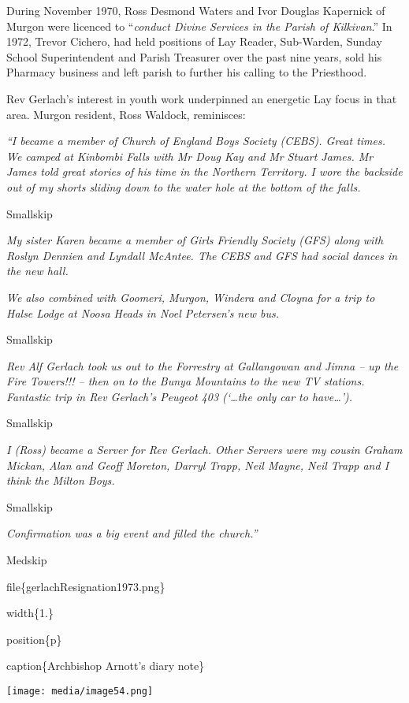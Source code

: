 During November 1970, Ross Desmond Waters and Ivor Douglas Kapernick of Murgon were licenced to ``\emph{conduct Divine Services in the Parish of Kilkivan}.'' In 1972, Trevor Cichero, had held positions of Lay Reader, Sub-Warden, Sunday School Superintendent and Parish Treasurer over the past nine years, sold his Pharmacy business and left parish to further his calling to the Priesthood.

Rev Gerlach's interest in youth work underpinned an energetic Lay focus in that area. Murgon resident, Ross Waldock, reminisces:

\emph{``I became a member of Church of England Boys Society (CEBS). Great times. We camped at Kinbombi Falls with Mr Doug Kay and Mr Stuart James. Mr James told great stories of his time in the Northern Territory. I wore the backside out of my shorts sliding down to the water hole at the bottom of the falls.}

Smallskip

\emph{My sister Karen became a member of Girls Friendly Society (GFS) along with Roslyn Dennien and Lyndall McAntee. The CEBS and GFS had social dances in the new hall.}

\emph{We also combined with Goomeri, Murgon, Windera and Cloyna for a trip to Halse Lodge at Noosa Heads in Noel Petersen's new bus.}

Smallskip

\emph{Rev Alf Gerlach took us out to the Forrestry at Gallangowan and Jimna -- up the Fire Towers!!! -- then on to the Bunya Mountains to the new TV stations. Fantastic trip in Rev Gerlach's Peugeot 403 (`\ldots the only car to have\ldots').}

Smallskip

\emph{I (Ross) became a Server for Rev Gerlach. Other Servers were my cousin Graham Mickan, Alan and Geoff Moreton, Darryl Trapp, Neil Mayne, Neil Trapp and I think the Milton Boys.}

Smallskip

\emph{Confirmation was a big event and filled the church.''}

Medskip

file\{gerlachResignation1973.png\}

width\{1.\}

position\{p\}

caption\{Archbishop Arnott's diary note\}

\texttt{[image: media/image54.png]}

